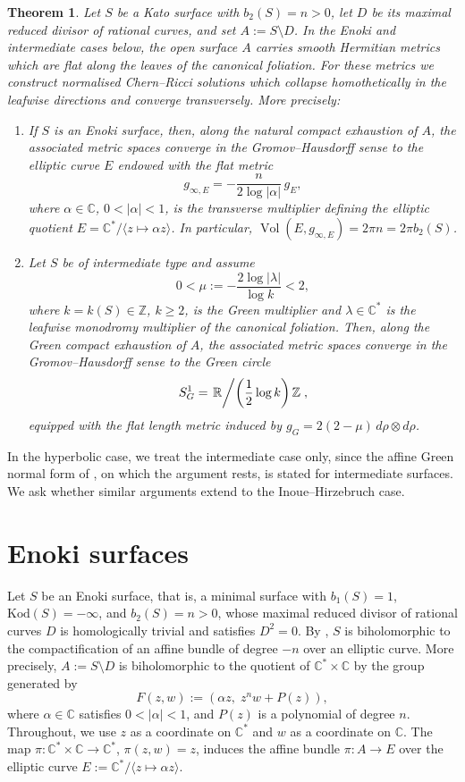 \documentclass[12pt]{amsart}
\numberwithin{equation}{section}
\newtheorem{theorem}{Theorem}
\theoremstyle{remark}
\theoremstyle{definition}
\begin{document}
\begin{theorem}\label{thm:main-open-kato-collapse}
Let $S$ be a Kato surface with $b_2(S)=n>0$, let $D$ be its maximal reduced divisor of rational curves, and set $A:=S\setminus D$. In the Enoki and intermediate cases below, the open surface $A$ carries smooth Hermitian metrics which are flat along the leaves of the canonical foliation. For these metrics we construct normalised Chern--Ricci solutions which collapse homothetically in the leafwise directions and converge transversely.  More precisely:
\begin{enumerate}
\item If $S$ is an Enoki surface, then, along the natural compact exhaustion of $A$, the associated metric spaces converge in the Gromov--Hausdorff sense to the elliptic curve $E$ endowed with the flat metric
$$g_{\infty,E}=-\frac{n}{2\log|\alpha|}\,g_E,$$
where $\alpha\in\mathbb C$, $0<|\alpha|<1$, is the transverse multiplier defining the elliptic quotient $E=\mathbb C^*/\langle z\mapsto\alpha z\rangle$. In particular, $\operatorname{Vol}(E,g_{\infty,E})=2\pi n=2\pi b_2(S)$.
\item Let $S$ be of intermediate type and assume
$$0<\mu:=-\frac{2\log|\lambda|}{\log k}<2,$$
where $k=k(S)\in\mathbb Z$, $k\geq2$, is the Green multiplier and $\lambda\in\mathbb C^*$ is the leafwise monodromy multiplier of the canonical foliation. Then, along the Green compact exhaustion of $A$, the associated metric spaces converge in the Gromov--Hausdorff sense to the Green circle
$$S^1_G=\left.\mathbb R\middle/\left(\frac12\log k\right)\mathbb Z\right.,$$
equipped with the flat length metric induced by $g_G=2(2-\mu)\,d\rho\otimes d\rho$.
\end{enumerate}
\end{theorem}

In the hyperbolic case, we treat the intermediate case only, since the affine Green normal form of \cite{dloussky-oeljeklaus-toma}, on which the argument rests, is stated for intermediate surfaces. We ask whether similar arguments extend to the Inoue--Hirzebruch case.


\section{Enoki surfaces}

Let $S$ be an Enoki surface, that is, a minimal surface with $b_1(S)=1$, $\mathrm{Kod}(S)=-\infty$, and $b_2(S)=n>0$, whose maximal reduced divisor of rational curves $D$ is homologically trivial and satisfies $D^2=0$. By \cite[Main Theorem]{Enoki}, $S$ is biholomorphic to the compactification of an affine bundle of degree $-n$ over an elliptic curve. More precisely, $A:=S\setminus D$ is biholomorphic to the quotient of $\mathbb C^*\times\mathbb C$ by the group generated by
$$ F(z,w) := \left( \alpha z, \; z^n w + P(z)\right), $$
where $\alpha \in \mathbb C$ satisfies $0<|\alpha|<1$, and $P(z)$ is a polynomial of degree $n$.
Throughout, we use $z$ as a coordinate on $\mathbb C^*$ and $w$ as a coordinate on $\mathbb C$.
The map $\pi \colon \mathbb C^*\times\mathbb C \to \mathbb C^*$, $\pi(z,w)=z$, induces the affine bundle $\pi \colon A \to E$ over the elliptic curve $E:=\mathbb C^*/\langle z \mapsto \alpha z \rangle$.
\end{document}

